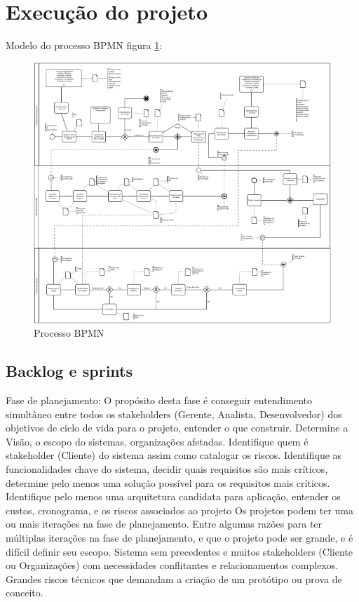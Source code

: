 \documentclass[	DIV=calc,%
							paper=a4,%
							fontsize=12pt,%
							onecolumn]{scrartcl}	 					%
\begin{document}
\section{Execução do projeto}

  Modelo do processo BPMN figura \ref{rup2}: 
 \begin{figure}
	\centering
	\includegraphics[]{diagram (1).png}
	\caption{Processo BPMN}
	\label{rup2}
\end{figure}

\subsection{Backlog e sprints}

    Fase de planejamento: O propósito desta fase é conseguir entendimento simultâneo entre todos os stakeholders (Gerente, Analista, Desenvolvedor) dos objetivos de ciclo de vida para o projeto, entender o que construir. Determine a Visão, o escopo do sistemas, organizações afetadas. Identifique quem é stakeholder (Cliente) do sistema assim como catalogar os riscos. Identifique as funcionalidades chave do sistema, decidir quais requisitos são mais críticos, determine pelo menos uma solução possível para os requisitos mais críticos. Identifique pelo menos uma arquitetura candidata para aplicação, entender os custos, cronograma, e os riscos associados ao projeto
Os projetos podem ter uma ou mais iterações na fase de planejamento. Entre algumas razões para ter múltiplas iterações na fase de planejamento, e que o projeto pode ser grande, e é difícil definir seu escopo. Sistema sem precedentes e muitos stakeholders (Cliente ou Organizações) com necessidades conflitantes e relacionamentos complexos. Grandes riscos técnicos que demandam a criação de um protótipo ou prova de conceito.
\end{document}
